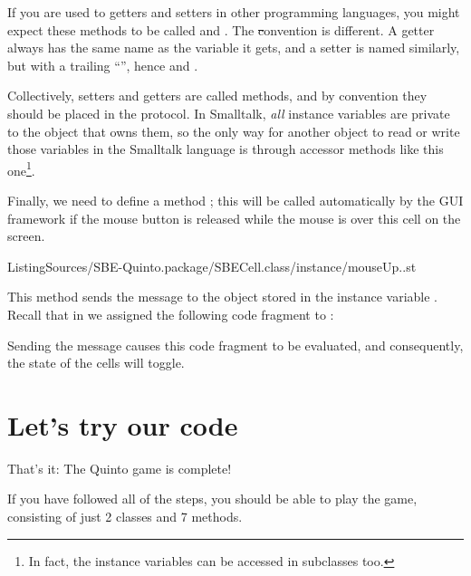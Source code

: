 \documentclass[a4paper,10pt,twoside]{book}
\begin{document}
If you are used to getters and setters in other programming languages, you might expect these methods to be called  and .
The \st convention is different.
A getter always has the same name as the variable it gets, and a setter is named similarly, but with a trailing ``\ct{:}'', hence  and .

Collectively, setters and getters are called  methods, and by convention they should be placed in the  protocol.
In Smalltalk, \emph{all} instance variables are private to the object that owns them, so the only way for another object to read or write those variables in the Smalltalk language is through accessor methods like this one\footnote{%
	In fact, the instance variables can be accessed in subclasses too.%
}.


Finally, we need to define a method ; this will be called automatically by the GUI framework if the mouse button is released while the mouse is over this cell on the screen.

%
{ListingSources/SBE-Quinto.package/SBECell.class/instance/mouseUp..st}


This method sends the message  to the object stored in the instance variable . 
Recall that in  we assigned the following code fragment to :


\noindent
Sending the  message causes this code fragment to be evaluated, and consequently, the state of the cells will toggle.

\section{Let's try our code}

That's it:
The Quinto game is complete!

If you have followed all of the steps, you should be able to play the game, consisting of just 2 classes and 7 methods.
\end{document}

